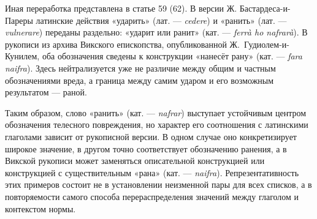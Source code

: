 Иная переработка представлена в статье 59 (62). В версии Ж. Бастардеса-и-Пареры латинские действия «ударить» (лат. --- \emph{cedere}) и «ранить» (лат. --- \emph{vulnerare}) переданы раздельно: «ударит или ранит» (кат. --- \emph{ferrà ho nafrarà}). В рукописи из архива Викского епископства, опубликованной Ж.~Гудиолем-и-Кунилем, оба обозначения сведены к конструкции «нанесёт рану» (кат. --- \emph{fara naifra}). Здесь нейтрализуется уже не различие между общим и частным обозначениями вреда, а граница между самим ударом и его возможным результатом --- раной.

Таким образом, слово «ранить» (кат. --- \emph{nafrar}) выступает устойчивым центром обозначения телесного повреждения, но характер его соотношения с латинскими глаголами зависит от рукописной версии. В одном случае оно конкретизирует широкое значение, в другом точно соответствует обозначению ранения, а в Викской рукописи может заменяться описательной конструкцией или конструкцией с существительным «рана» (кат. --- \emph{naifra}). Репрезентативность этих примеров состоит не в установлении неизменной пары для всех списков, а в повторяемости самого способа перераспределения значений между глаголом и контекстом нормы.

